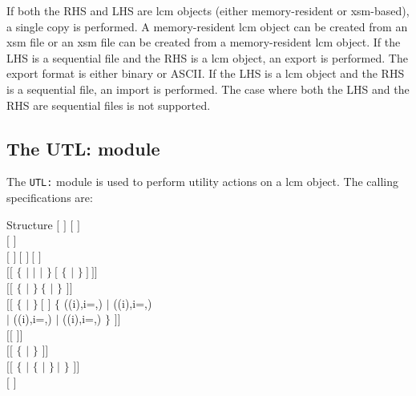 If both the RHS and LHS are {\sc lcm} objects (either memory-resident or {\sc xsm}-based), a single copy is
performed. A memory-resident {\sc lcm} object can be created from an {\sc xsm} file or an {\sc xsm}
file can be created from a memory-resident {\sc lcm} object. If the LHS is a sequential file and the
RHS is a {\sc lcm} object, an export is performed. The export
format is either binary or ASCII.
If the LHS is a {\sc lcm} object and the RHS is a sequential
file, an import is performed. The case where both the LHS and the RHS are
sequential files is not supported.

\clearpage

\subsection{The UTL: module}\label{sect:UTLData}

The {\tt UTL:} module is used to perform utility actions on a {\sc lcm} object.
The calling specifications are:

\begin{DataStructure}{Structure }
$[$  \moc{:=} $]$  $[$  $]$ \moc{::} \\
$[$   $]$ \\
$[$  $]~[$  $]~[$  $]$ \\
$[[$  $\{$   $|$
  $|$  $|$  $\}~[$  $\{$  $|$   $\}~]~]]$ \\
$[[$  $\{$  $|$  $\}~\{$  $|$ \moc{*} $\}$ $]]$ \\
$[[$  $\{$  $|$  $\}~[$  $]$  \moc{=} $\{$
((i),i=,) $|$ ((i),i=,) \\
$|$ ((i),i=,) $|$ ((i),i=,) $\}$ $]]$ \\
$[[$   $]]$ \\
$[[$  $\{$  $|$  $\}$  $]]$ \\ $[[$ $\{$
 $|$  $\{$  $|$  $\}~|$  $\}$   $]]$ \\
$[$  $]$ \moc{;}
\end{DataStructure}

